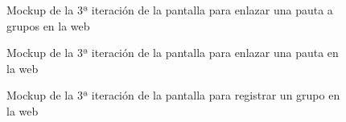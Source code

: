 \begin{figure}[H]
    \centering
    \caption[Mockup de la 3ª iteración de la pantalla para enlazar una pauta a grupos en la web]{Mockup de la 3ª iteración de la pantalla para enlazar una pauta a grupos en la web}
    \label{c4:fig:v3:web:enlazarPautaGrupos}
\end{figure}

\begin{figure}[H]
    \centering
    \caption[Mockup de la 3ª iteración de la pantalla para editar una pauta en la web]{Mockup de la 3ª iteración de la pantalla para enlazar una pauta en la web}
    \label{c4:fig:v3:web:editarPauta}
\end{figure}

\begin{figure}[H]
    \centering
    \caption[Mockup de la 3ª iteración de la pantalla para registrar un grupo en la web]{Mockup de la 3ª iteración de la pantalla para registrar un grupo en la web}
    \label{c4:fig:v3:web:registrarGrupo}
\end{figure}

